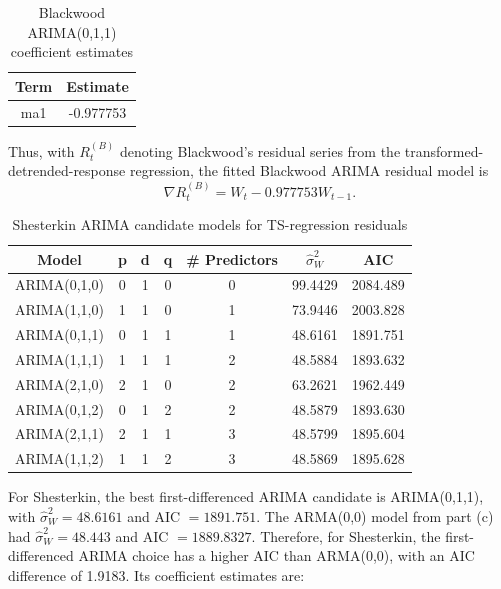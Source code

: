 \documentclass[
  10pt,
]{extarticle}
\begin{document}
\begin{center}
\scriptsize
\begin{table}[H]

\caption{\label{tab:p2-arima-blackwood-coef}Blackwood ARIMA(0,1,1) coefficient estimates}
\centering
\begin{tabular}[t]{cc}
\toprule
Term & Estimate\\
\midrule
ma1 & -0.977753\\
\bottomrule
\end{tabular}
\end{table}
\normalsize
\end{center}

Thus, with \(R_t^{(B)}\) denoting Blackwood's residual series from the transformed-detrended-response regression, the fitted Blackwood ARIMA residual model is
\[
\nabla R_t^{(B)} = W_t - 0.977753 W_{t-1}.
\]

\begin{center}
\scriptsize
\begin{table}[H]

\caption{\label{tab:p2-arima-shesterkin-table}Shesterkin ARIMA candidate models for TS-regression residuals}
\centering
\begin{tabular}[t]{ccccccc}
\toprule
Model & p & d & q & \# Predictors & $\hat{\sigma}_W^2$ & AIC\\
\midrule
ARIMA(0,1,0) & 0 & 1 & 0 & 0 & 99.4429 & 2084.489\\
ARIMA(1,1,0) & 1 & 1 & 0 & 1 & 73.9446 & 2003.828\\
ARIMA(0,1,1) & 0 & 1 & 1 & 1 & 48.6161 & 1891.751\\
ARIMA(1,1,1) & 1 & 1 & 1 & 2 & 48.5884 & 1893.632\\
ARIMA(2,1,0) & 2 & 1 & 0 & 2 & 63.2621 & 1962.449\\
\addlinespace
ARIMA(0,1,2) & 0 & 1 & 2 & 2 & 48.5879 & 1893.630\\
ARIMA(2,1,1) & 2 & 1 & 1 & 3 & 48.5799 & 1895.604\\
ARIMA(1,1,2) & 1 & 1 & 2 & 3 & 48.5869 & 1895.628\\
\bottomrule
\end{tabular}
\end{table}
\normalsize
\end{center}

For Shesterkin, the best first-differenced ARIMA candidate is ARIMA(0,1,1), with \(\hat{\sigma}_W^2 = 48.6161\) and AIC \(= 1891.751\). The ARMA(0,0) model from part (c) had \(\hat{\sigma}_W^2 = 48.443\) and AIC \(= 1889.8327\). Therefore, for Shesterkin, the first-differenced ARIMA choice has a higher AIC than ARMA(0,0), with an AIC difference of 1.9183. Its coefficient estimates are:
\end{document}

